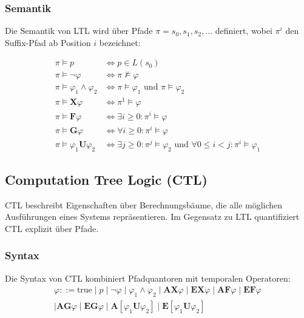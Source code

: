 ﻿\documentclass[a4paper,12pt]{article}
\theoremstyle{definition}
\begin{document}
\subsubsection{Semantik}

Die Semantik von LTL wird über Pfade $\pi = s_0, s_1, s_2, \ldots$ definiert, wobei $\pi^i$ den Suffix-Pfad ab Position $i$ bezeichnet:

\begin{align}
\pi \models p &\iff p \in L(s_0) \\
\pi \models \neg\varphi &\iff \pi \not\models \varphi \\
\pi \models \varphi_1 \land \varphi_2 &\iff \pi \models \varphi_1 \text{ und } \pi \models \varphi_2 \\
\pi \models \mathbf{X}\varphi &\iff \pi^1 \models \varphi \\
\pi \models \mathbf{F}\varphi &\iff \exists i \geq 0: \pi^i \models \varphi \\
\pi \models \mathbf{G}\varphi &\iff \forall i \geq 0: \pi^i \models \varphi \\
\pi \models \varphi_1 \mathbf{U} \varphi_2 &\iff \exists j \geq 0: \pi^j \models \varphi_2 \text{ und } \forall 0 \leq i < j: \pi^i \models \varphi_1
\end{align}

\subsection{Computation Tree Logic (CTL)}

CTL beschreibt Eigenschaften über Berechnungsbäume, die alle möglichen Ausführungen eines Systems repräsentieren. Im Gegensatz zu LTL quantifiziert CTL explizit über Pfade.

\subsubsection{Syntax}

Die Syntax von CTL kombiniert Pfadquantoren mit temporalen Operatoren:
\begin{multline}
\varphi ::= \text{true} \mid p \mid \neg \varphi \mid \varphi_1 \land \varphi_2
  \mid \mathbf{AX}\varphi \mid \mathbf{EX}\varphi \mid \mathbf{AF}\varphi \mid \mathbf{EF}\varphi \\
  \mid \mathbf{AG}\varphi \mid \mathbf{EG}\varphi
  \mid \mathbf{A}[\varphi_1 \mathbf{U} \varphi_2] \mid \mathbf{E}[\varphi_1 \mathbf{U} \varphi_2]
\end{multline}
\end{document}
